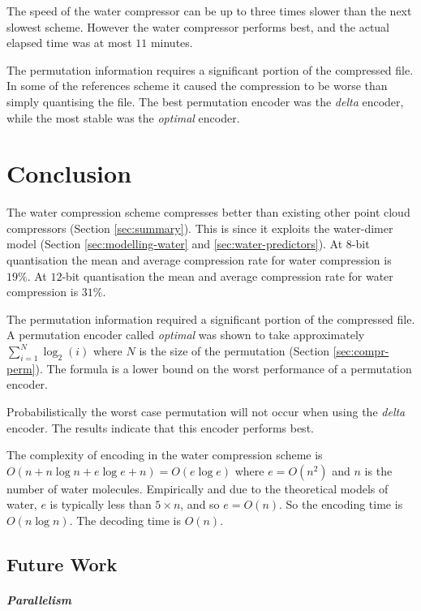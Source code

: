 \documentclass[a4paper]{report}
\begin{document}
The speed of the water compressor can be up to three times slower than the
next slowest scheme. However the water compressor performs best, and the
actual elapsed time was at most $11$ minutes.

The permutation information requires a significant portion of the compressed
file. In some of the references scheme it caused the compression to be worse
than simply quantising the file. The best permutation encoder was the
\emph{delta} encoder, while the most stable was the \emph{optimal} encoder.



\chapter{Conclusion}

The water compression scheme compresses better than existing other point cloud
compressors (Section \ref{sec:summary}). This is since it exploits the
water-dimer model (Section \ref{sec:modelling-water} and
\ref{sec:water-predictors}). At $8$-bit quantisation the mean and average
compression rate for water compression is $19\%$. At $12$-bit quantisation the
mean and average compression rate for water compression is $31\%$.

The permutation information required a significant portion of the compressed
file. A permutation encoder called \emph{optimal} was shown to take
approximately $\sum^{N}_{i=1} \log_2(i)$ where $N$ is the size of the
permutation (Section \ref{sec:compr-perm}). The formula is a lower bound on
the worst performance of a permutation encoder.

Probabilistically the worst case permutation will not occur when using the
\emph{delta} encoder. The results indicate that this encoder performs best.

The complexity of encoding in the water compression scheme is $O(n + n \log n
+ e \log e + n) = O(e \log e)$ where $e = O(n^2)$ and $n$ is the number of
water molecules. Empirically and due to the theoretical models of water, $e$
is typically less than $5 \times n$, and so $e = O(n)$. So the encoding time
is $O(n \log n)$. The decoding time is $O(n)$.


\section{Future Work}

\paragraph{Parallelism}
\end{document}
